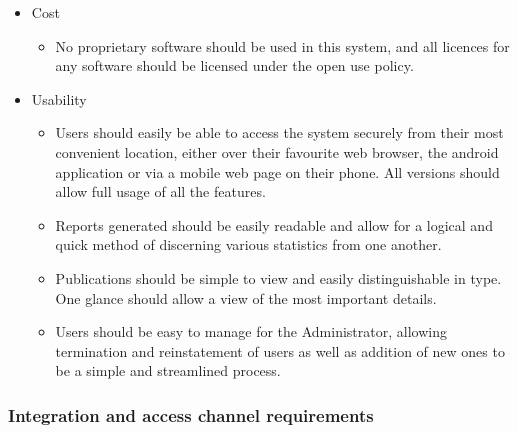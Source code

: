 \documentclass{article}
\begin{document}
\begin{itemize}
\begin{itemize}
			\end{itemize}
			\item Cost
			\begin{itemize}
				\item No proprietary software should be used in this system, and all licences for any software should be licensed under the open use policy.
			\end{itemize}
			\item Usability
			\begin{itemize}
				\item Users should easily be able to access the system securely from their most convenient location, either over their favourite web browser, the android application or via a mobile web page on their phone. All versions should allow full usage of all the features.
				\item Reports generated should be easily readable and allow for a logical and quick method of discerning various statistics from one another.
				\item Publications should be simple to view and easily distinguishable in type. One glance should allow a view of the most important details.
				\item Users should be easy to manage for the Administrator, allowing termination and reinstatement of users as well as addition of new ones to be a simple and streamlined process.
			\end{itemize}
		\end{itemize}
		
		\subsubsection{Integration and access channel requirements}\label{subsubsec:integration}
		
\end{document}
